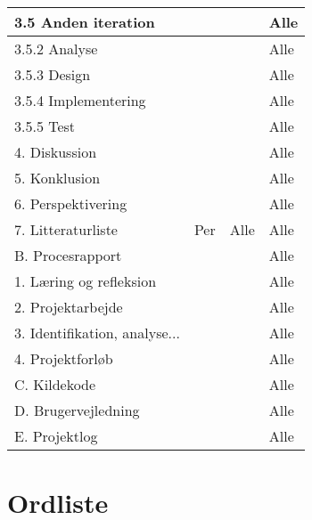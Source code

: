 \begin{center}
\begin{longtable}{|m{5.8cm}|m{3.5cm}|m{3.5cm}|m{3.2cm}|}
3.5 Anden iteration & & & Alle\\ \hline
3.5.2 Analyse & & & Alle\\ \hline
3.5.3 Design & & & Alle\\ \hline
3.5.4 Implementering & & & Alle\\ \hline
3.5.5 Test & & & Alle\\ \hline

4. Diskussion & & & Alle\\ \hline

5. Konklusion & & & Alle\\ \hline

6. Perspektivering & & & Alle\\ \hline

7. Litteraturliste & Per & Alle & Alle\\ \hline

B. Procesrapport & & & Alle\\ \hline
1. Læring og refleksion & & & Alle\\ \hline
2. Projektarbejde & & & Alle\\ \hline
3. Identifikation, analyse... & & & Alle\\ \hline
4. Projektforløb & & & Alle\\ \hline

C. Kildekode & & & Alle\\ \hline

D. Brugervejledning & & & Alle\\ \hline

E. Projektlog & & & Alle\\ \hline


\end{longtable}
\end{center}

\section{Ordliste}

